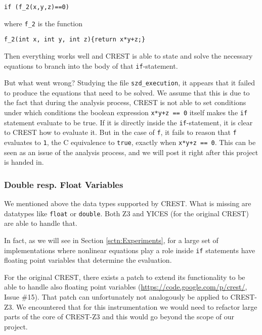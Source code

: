 \documentclass[oribibl]{llncs}
\begin{document}
\begin{verbatim}
if (f_2(x,y,z)==0)
\end{verbatim}

where \texttt{f\_2} is the function
\begin{verbatim}
f_2(int x, int y, int z){return x*y+z;}
\end{verbatim}

Then everything works well and \textsc{CREST} is able to state and
solve the necessary equations to branch into the body of that \texttt{if}-statement.

But what went wrong? Studying the file \texttt{szd\_execution}, it
appears that it failed to produce the equations that need to be
solved. We assume that this is due to the fact that during the
analysis process, \textsc{CREST} is not able to set conditions under
which conditions the boolean expression \texttt{x*y+z == 0} itself makes the
\texttt{if} statement evaluate to be true. If it is directly inside
the \texttt{if}-statement, it is clear to \textsc{CREST} how to
evaluate it. But in the case of \texttt{f}, it fails to reason that
\texttt{f} evaluates to
\texttt{1}, the \textsc{C} equivalence to \texttt{true}, exactly when \texttt{x*y+z == 0}.
This can be seen as an issue of the analysis process, and we will post
it right after this project is handed in.

\subsubsection{Double resp. Float Variables}
\label{sbsbsctn:dblrespfloat}

We mentioned above the data types supported by \textsc{CREST}. What is
missing are datatypes like \texttt{float} or \texttt{double}. Both
\textsc{Z3} and \textsc{YICES} (for the original \textsc{CREST}) are
able to handle that.

In fact, as we will see in Section \ref{sctn:Experiments}, for a large set
of implementations where nonlinear equations play a role inside \texttt{if}
statements have floating point variables that determine the
evaluation.

For the original \textsc{CREST}, there exists a patch to extend its
functionality to be able to handle also floating point variables
(\url{https://code.google.com/p/crest/}, Issue \#15). That
patch can unfortunately not analogously be applied to
\textsc{CREST-Z3}. We encountered that for this instrumentation we
would need to refactor large parts of the core of \textsc{CREST-Z3}
and this would go beyond the scope of our project.
\end{document}
